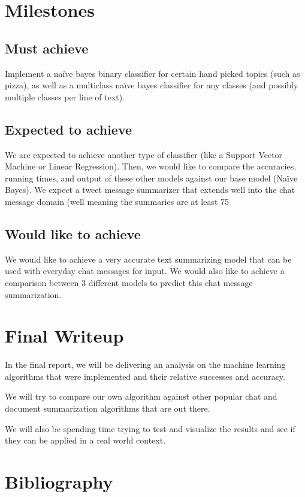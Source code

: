 \documentclass[11pt]{article}
\begin{document}
\section{Milestones}
\subsection{Must achieve}
Implement a naïve bayes binary classifier for certain hand picked topics (such as pizza), as well as a multiclass naïve bayes classifier for any classes (and possibly multiple classes per line of text).

\subsection{Expected to achieve}
We are expected to achieve another type of classifier (like a Support Vector Machine or Linear Regression). Then, we would like to compare the accuracies, running times, and output of these other models against our base model (Naïve Bayes). We expect a tweet message summarizer that extends well into the chat message domain (well meaning the summaries are at least 75%

\subsection{Would like to achieve}
We would like to achieve a very accurate text summarizing model that can be used with everyday chat messages for input. We would also like to achieve a comparison between 3 different models to predict this chat message summarization. 

\section{Final Writeup}
In the final report, we will be delivering an analysis on the machine learning algorithms that were implemented and their relative successes and accuracy. 

We will try to compare our own algorithm against other popular chat and document summarization algorithms that are out there.

We will also be spending time trying to test and visualize the results and see if they can be applied in a real world context.


\section{Bibliography}
\end{document}
